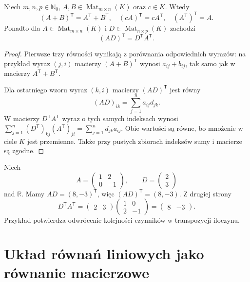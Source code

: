 \begin{stwierdzenie}
\label{prop:lin4-transpozycja-dzialania}
Niech \(m,n,p\in\mathbb N_0\),
\(A,B\in\operatorname{Mat}_{m\times n}(K)\)
oraz \(c\in K\). Wtedy
\[
 (A+B)^{\mathsf T}=A^{\mathsf T}+B^{\mathsf T},
 \quad(cA)^{\mathsf T}=cA^{\mathsf T},
 \quad(A^{\mathsf T})^{\mathsf T}=A.
\]
Ponadto dla \(A\in\operatorname{Mat}_{m\times n}(K)\)
i \(D\in\operatorname{Mat}_{n\times p}(K)\)
zachodzi
\[
 (AD)^{\mathsf T}=D^{\mathsf T}A^{\mathsf T}.
\]
\end{stwierdzenie}
\begin{proof}
Pierwsze trzy równości wynikają
z porównania odpowiednich wyrazów:
na przykład wyraz \((j,i)\) macierzy
\((A+B)^{\mathsf T}\) wynosi
\(a_{ij}+b_{ij}\), tak samo jak
w macierzy \(A^{\mathsf T}+B^{\mathsf T}\).

Dla ostatniego wzoru wyraz \((k,i)\)
macierzy \((AD)^{\mathsf T}\) jest równy
\[
 (AD)_{ik}=\sum_{j=1}^{n}a_{ij}d_{jk}.
\]
W macierzy \(D^{\mathsf T}A^{\mathsf T}\)
wyraz o tych samych indeksach wynosi
\(\sum_{j=1}^{n}(D^{\mathsf T})_{kj}
(A^{\mathsf T})_{ji}
=\sum_{j=1}^{n}d_{jk}a_{ij}\).
Obie wartości są równe, bo mnożenie
w ciele \(K\) jest przemienne.
Także przy pustych zbiorach indeksów
sumy i macierze są zgodne.
\end{proof}

\begin{przyklad}
\label{prz:lin4-transpozycja}
Niech
\[
 A=\begin{pmatrix}1&2\\0&-1\end{pmatrix},
 \qquad
 D=\begin{pmatrix}2\\3\end{pmatrix}
\]
nad \(\mathbb R\).
Mamy
\(AD=(8,-3)^{\mathsf T}\), więc
\((AD)^{\mathsf T}=(8,-3)\).
Z drugiej strony
\[
 D^{\mathsf T}A^{\mathsf T}
 =\begin{pmatrix}2&3\end{pmatrix}
  \begin{pmatrix}1&0\\2&-1\end{pmatrix}
 =\begin{pmatrix}8&-3\end{pmatrix}.
\]
Przykład potwierdza odwrócenie
kolejności czynników w transpozycji iloczynu.
\end{przyklad}

\section{Układ równań liniowych jako równanie macierzowe}
\label{sec:lin4-uklady}

